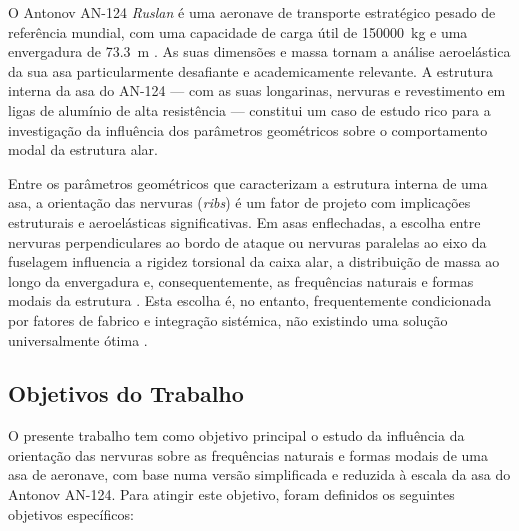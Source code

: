 \documentclass[a4paper,fleqn,noprintline]{cas-dc}
\begin{document}
O Antonov AN-124 \textit{Ruslan} é uma aeronave de transporte estratégico pesado de referência mundial, com uma capacidade de carga útil de \SI{150000}{\kilo\gram} e uma envergadura de \SI{73.3}{\meter} \cite{Gordon2008}. As suas dimensões e massa tornam a análise aeroelástica da sua asa particularmente desafiante e academicamente relevante. A estrutura interna da asa do AN-124 --- com as suas longarinas, nervuras e revestimento em ligas de alumínio de alta resistência --- constitui um caso de estudo rico para a investigação da influência dos parâmetros geométricos sobre o comportamento modal da estrutura alar.

Entre os parâmetros geométricos que caracterizam a estrutura interna de uma asa, a orientação das nervuras (\textit{ribs}) é um fator de projeto com implicações estruturais e aeroelásticas significativas. Em asas enflechadas, a escolha entre nervuras perpendiculares ao bordo de ataque ou nervuras paralelas ao eixo da fuselagem influencia a rigidez torsional da caixa alar, a distribuição de massa ao longo da envergadura e, consequentemente, as frequências naturais e formas modais da estrutura \cite{Niu1988, Megson2012}. Esta escolha é, no entanto, frequentemente condicionada por fatores de fabrico e integração sistémica, não existindo uma solução universalmente ótima \cite{Raymer2018}.

\subsection{Objetivos do Trabalho}

O presente trabalho tem como objetivo principal o estudo da influência da orientação das nervuras sobre as frequências naturais e formas modais de uma asa de aeronave, com base numa versão simplificada e reduzida à escala da asa do Antonov AN-124. Para atingir este objetivo, foram definidos os seguintes objetivos específicos:
\end{document}
